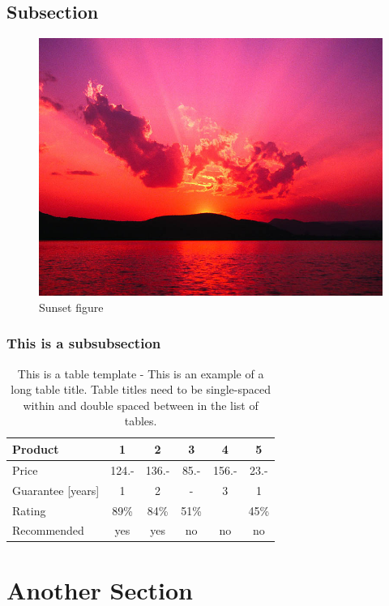 \subsection{Subsection}
\begin{figure}[H]
\centering
\includegraphics[scale=.50]{figures/Sunset.jpg}
\caption{Sunset figure}
\label{fig:sunset-fig2}
\end{figure}
\subsubsection{This is a subsubsection}
\begin{table}[H]
\centering
\caption{This is a table template - This is an example of a long table title.  Table titles need to be single-spaced within and double spaced between in the list of tables.}
\begin{tabular}{|l|c|c|c|c|c|}
\hline
Product & 1 & 2 & 3 & 4 & 5\\
\hline
Price & 124.- & 136.- & 85.- & 156.- & 23.-\\
Guarantee [years] & 1 & 2 & - & 3 & 1\\
Rating & 89\% & 84\% & 51\% & & 45\%\\
\hline
\hline
Recommended & yes & yes & no & no & no\\
\hline
\end{tabular}
\label{tab:template1-2}
\end{table}
\section{Another Section}

